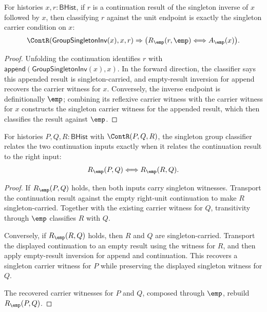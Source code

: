 \begin{theorem}
\label{thm:group-singleton-inv-continuation-left-unit-iff}
For histories $x,r:\mathsf{BHist}$, if $r$ is a continuation result of the
singleton inverse of $x$ followed by $x$, then classifying $r$ against the unit
endpoint is exactly the singleton carrier condition on $x$:
$$
\ContR(\mathsf{GroupSingletonInv}(x),x,r)
\Rightarrow
\bigl(R_{\emp}(r,\emp)\Longleftrightarrow A_{\emp}(x)\bigr).
$$
\end{theorem}
\begin{proof}
Unfolding the continuation identifies $r$ with
$\mathsf{append}(\mathsf{GroupSingletonInv}(x),x)$. In the forward direction,
the classifier says this appended result is singleton-carried, and
empty-result inversion for append recovers the carrier witness for $x$.
Conversely, the inverse endpoint is definitionally $\emp$; combining its
reflexive carrier witness with the carrier witness for $x$ constructs the
singleton carrier witness for the appended result, which then classifies the
result against $\emp$.
\end{proof}

\begin{theorem}
\label{thm:group-singleton-classifier-continuation-result-right}
For histories $P,Q,R:\mathsf{BHist}$ with $\ContR(P,Q,R)$, the singleton group
classifier relates the two continuation inputs exactly when it relates the
continuation result to the right input:
$$
R_{\emp}(P,Q)\Longleftrightarrow R_{\emp}(R,Q).
$$
\end{theorem}
\begin{proof}
If $R_{\emp}(P,Q)$ holds, then both inputs carry singleton witnesses. Transport
the continuation result against the empty right-unit continuation to make $R$
singleton-carried. Together with the existing carrier witness for $Q$,
transitivity through $\emp$ classifies $R$ with $Q$.

Conversely, if $R_{\emp}(R,Q)$ holds, then $R$ and $Q$ are singleton-carried.
Transport the displayed continuation to an empty result using the witness for
$R$, and then apply empty-result inversion for append and continuation. This
recovers a singleton carrier witness for $P$ while preserving the displayed
singleton witness for $Q$.

The recovered carrier witnesses for $P$ and $Q$, composed through $\emp$,
rebuild $R_{\emp}(P,Q)$.
\end{proof}

